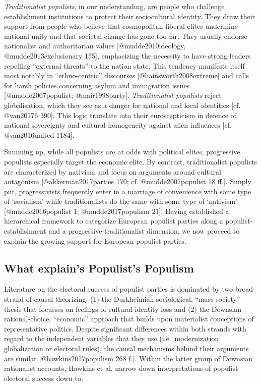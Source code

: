 \documentclass[]{article}
\begin{document}
\emph{Traditionalist populists}, in our understanding, are people who
challenge establishment institutions to protect their sociocultural
identity. They draw their support from people who believe that
cosmopolitan liberal elites undermine national unity and that societal
change has gone too far. They usually endorse nationalist and
authoritarian values {[}@mudde2010ideology, @mudde2013exclusionary
155{]}, emphasizing the necessity to have strong leaders repelling
``external threats'' to the nation state. This tendency manifests itself
most notably in ``ethno-centric'' discourses
{[}@hainsworth2008extreme{]} and calls for harsh policies concerning
asylum and immigration issues {[}@mudde2007populist; @mair1998party{]}.
\emph{Traditionalist populists} reject globalisation, which they see as
a danger for national and local identities {[}cf. @van20176 390{]}. This
logic translate into their euroscepticism in defence of national
sovereignty and cultural homogeneity against alien influences {[}cf.
@van2016united 1184{]}.

Summing up, while all populists are at odds with political elites,
progressive populists especially target the economic elite. By contrast,
traditionalist populists are characterized by nativism and focus on
arguments around cultural antagonism {[}@akkerman2017parties 170; cf.
@mudde2007populist 18 ff.{]}. Simply put, progressivists frequently
enter in a marriage of convenience with some type of `socialism' while
traditionalists do the same with some type of `nativism'
{[}@mudde2016populist 1; @mudde2017populism 21{]}. Having established a
hierarchical framework to categorize European populist parties along a
populist-establishment and a progressive-traditionalist dimension, we
now proceed to explain the growing support for European populist
parties.

\subsection{What explain's Populist's
Populism}\label{what-explains-populists-populism}

Literature on the electoral success of populist parties is dominated by
two broad strand of causal theorizing: (1) the Durkheimian sociological,
``mass society'' thesis that focusses on feelings of cultural identity
loss and (2) the Downsian rational-choice, ``economic'' approach that
builds upon materialist conceptions of representative politics. Despite
significant differences within both strands with regard to the
independent variables that they use (i.e.~modernization, globalization
or electoral rules), the causal mechanisms behind their arguments are
similar {[}@hawkins2017populism 268 f.{]}. Within the latter group of
Downsian rationalist accounts, Hawkins et al. narrow down
interpretations of populist electoral success down to:
\end{document}
